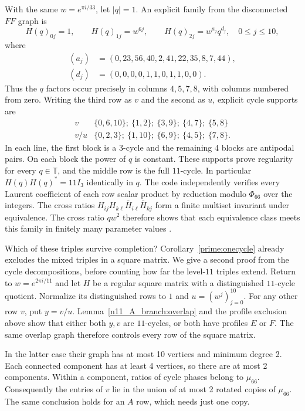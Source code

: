 \documentclass[11pt,a4paper]{article}
\numberwithin{equation}{section}
\begin{document}
\medskip
With the same $w=e^{\pi i/33}$, let $|q|=1$. An explicit family from the disconnected $FF$ graph is
$$H(q)_{0j}=1,\qquad H(q)_{1j}=w^{6j},\qquad H(q)_{2j}=w^{a_j}q^{d_j},\quad 0\le j\le10,$$
where
\begin{align*}
(a_j)&=(0,23,56,40,2,41,22,35,8,7,44),\\
(d_j)&=(0,0,0,0,1,1,0,1,1,0,0).
\end{align*}
Thus the $q$ factors occur precisely in columns $4,5,7,8$, with columns numbered from zero. Writing the third row as $v$ and the second as $u$, explicit cycle supports are
$$\begin{array}{c|l}
v & \{0,6,10\};\ \{1,2\};\ \{3,9\};\ \{4,7\};\ \{5,8\}\\[2pt]
v/u & \{0,2,3\};\ \{1,10\};\ \{6,9\};\ \{4,5\};\ \{7,8\}.
\end{array}$$
In each line, the first block is a $3$-cycle and the remaining 4 blocks are antipodal pairs. On each block the power of $q$ is constant. These supports prove regularity for every $q\in\mathbb{T}$, and the middle row is the full $11$-cycle. In particular $H(q)H(q)^*=11I_3$ identically in $q$. The code independently verifies every Laurent coefficient of each row scalar product by reduction modulo $\Phi_{66}$ over the integers. The cross ratios $H_{ij}H_{k\ell}\bar H_{i\ell}\bar H_{kj}$ form a finite multiset invariant under equivalence. The cross ratio $qw^{2}$ therefore shows that each equivalence class meets this family in finitely many parameter values \cite{ha1,tz1}.

\medskip
Which of these triples survive completion? Corollary~\ref{prime:onecycle} already excludes the mixed triples in a square matrix. We give a second proof from the cycle decompositions, before counting how far the level-$11$ triples extend. Return to $w=e^{2\pi i/11}$ and let $H$ be a regular square matrix with a distinguished $11$-cycle quotient. Normalize its distinguished rows to $1$ and $u=(w^{j})_{j=0}^{10}$. For any other row $v$, put $y=v/u$. Lemma~\ref{n11_A_branch:overlap} and the profile exclusion above show that either both $y,v$ are $11$-cycles, or both have profiles $E$ or $F$. The same overlap graph therefore controls every row of the square matrix.

In the latter case their graph has at most 10 vertices and minimum degree 2. Each connected component has at least 4 vertices, so there are at most 2 components. Within a component, ratios of cycle phases belong to $\mu_{66}$. Consequently the entries of $v$ lie in the union of at most 2 rotated copies of $\mu_{66}$. The same conclusion holds for an $A$ row, which needs just one copy.
\end{document}
